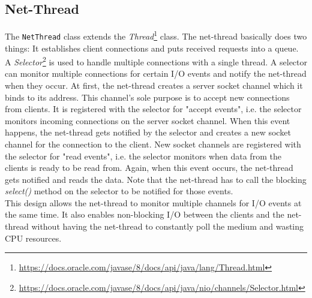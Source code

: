\subsection{Net-Thread}
The \texttt{NetThread} class extends the \textit{Thread}\footnote{\url{https://docs.oracle.com/javase/8/docs/api/java/lang/Thread.html}} class. 
The net-thread basically does two things: It establishes client connections and puts received requests into a queue. \\

A \textit{Selector}\footnote{\url{https://docs.oracle.com/javase/8/docs/api/java/nio/channels/Selector.html}} is used to handle multiple connections with a single thread. A selector can monitor multiple connections for certain I/O events and notify the net-thread when they occur. At first, the net-thread creates a server socket channel which it binds to its address. This channel's sole purpose is to accept new connections from clients. It is registered with the selector for "accept events", i.e. the selector monitors incoming connections on the server socket channel. When this event happens, the net-thread gets notified by the selector and creates a new socket channel for the connection to the client. New socket channels are registered with the selector for "read events", i.e. the selector monitors when data from the clients is ready to be read from. Again, when this event occurs, the net-thread gets notified and reads the data. Note that the net-thread has to call the blocking \textit{select()} method on the selector to be notified for those events.\\
This design allows the net-thread to monitor multiple channels for I/O events at the same time. It also enables non-blocking I/O between the clients and the net-thread without having the net-thread to constantly poll the medium and wasting CPU resources. \\

